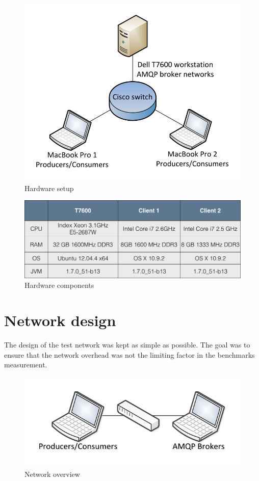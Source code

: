 \documentclass{thesis}
\begin{document}
\begin{figure}[h]
\centering
\includegraphics[scale=.7]{test_setup_2}  
\caption{Hardware setup}
\label{fig:harware-setup}
\end{figure}

\begin{figure}[h]
\centering
\includegraphics[scale=.30]{hardware_components}  
\caption{Hardware components}
\label{fig:hardware-components}
\end{figure}

\section{Network design}
The design of the test network was kept as simple as possible.  The goal was to ensure that the network overhead was not the limiting factor in the benchmarks measurement.

\begin{figure}[h]
\centering
\includegraphics{test_setup}  
\caption{Network overview}
\label{fig:network-overview}
\end{figure}
\end{document}
